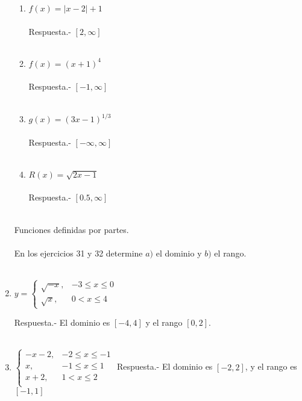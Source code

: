 \begin{enumerate}[\bfseries 1.]
\begin{enumerate}[\bfseries a)]
    \item $f(x) = |x-2|+1$\\\\
	Respuesta.-\; $[2,\infty]$\\\\

    \item $f(x) = (x+1)^4$\\\\
	Respuesta.-\; $[-1,\infty]$\\\\

    \item $g(x) = (3x-1)^{1/3}$\\\\
	Respuesta.-\; $[-\infty,\infty]$\\\\

    \item $R(x) = \sqrt{2x-1}$\\\\
	Respuesta.-\; $[0.5,\infty]$\\\\

\end{enumerate}

Funciones definidas por partes.\\\\
En los ejercicios 31 y 32 determine $a)$ el dominio y $b)$ el rango.\\\\

\item $y=\left\{\begin{array}{rl}
	\sqrt{-x},&-3\leq x \leq 0\\
	\sqrt{x},&0<x\leq 4
    \end{array}\right.$\\
    \vspace{.3cm}

    Respuesta.-\; El dominio es $[-4,4]$ y el rango $[0,2]$.\\\\

\item $\left\{\begin{array}{rl}
	-x-2,&-2\leq x \leq -1\\
	x,&-1\leq x \leq 1\\
	x+2,&1<x\leq 2\\
    \end{array}\right.$
    \vspace{.3cm}
    Respuesta.-\; El dominio es $[-2,2]$, y el rango es $[-1,1]$\\\\


\end{enumerate}
